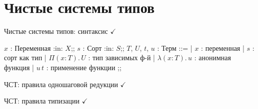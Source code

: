 \documentclass[russian]{beamer}
\begin{document}
\section{Чистые системы типов}
\begin{frame}{Чистые системы типов: синтаксис
    $\checkmark$}
\begin{bnf}
$x$ : \textsf{Переменная} :in: $X$;;
$s$ : \textsf{Сорт} :in: $S$;;
$T$, $U$, $t$, $u$ : \textsf{Терм} ::=
| $x$ : переменная
| $s$ : сорт как тип
| $\Pi(x\colon T).\,U$ : тип зависимых ф-й
| $\lambda(x\colon T).\,u$ : анонимная функция
| $u\,t$ : применение функции
;;
\end{bnf}
\end{frame}
\begin{frame}{ЧСТ: правила одношаговой редукции
    $\checkmark$}
\end{frame}
\begin{frame}{ЧСТ: правила типизации $\checkmark$}
\end{frame}
\end{document}
